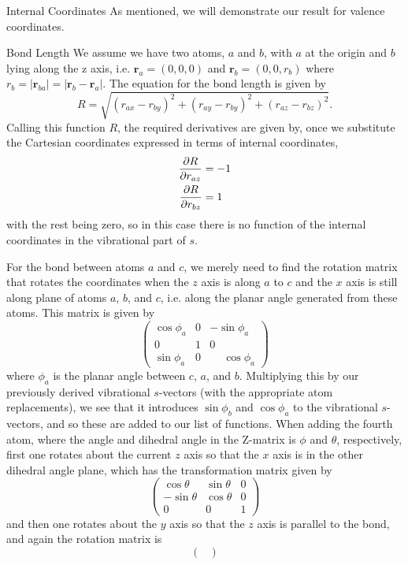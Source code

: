 \documentclass{article}
\newcommand{\vect}[1]{\boldsymbol{#1}}
\begin{document}
\begin{subsection}{Internal Coordinates}
As mentioned, we will demonstrate our result for valence coordinates. 
\begin{subsubsection}{Bond Length}
We assume we have two atoms, $a$ and $b$, with $a$ at the origin and $b$ lying along the z axis, i.e. $\vect{r}_a = (0,0,0)$ and $\vect{r}_b = (0,0,r_b)$ where $r_b = |\vect{r}_{ba}| = |\vect{r}_b - \vect{r}_a|.$ The equation for the bond length is given by 
\[
	R = \sqrt{(r_{ax} - r_{by})^2 + (r_{ay} - r_{by})^2 + (r_{az} - r_{bz})^2}.
\]
Calling this function $R$, the required derivatives are given by, once we substitute the Cartesian coordinates expressed in terms of internal coordinates, 
\[
\begin{split}
	\pdv{R}{r_{az}} &= -1 \\
	\pdv{R}{r_{bz}} &= 1 \\
\end{split}
\]
with the rest being zero, so in this case there is no function of the internal coordinates in the vibrational part of $s$. 
	
For the bond between atoms $a$ and $c$, we merely need to find the rotation matrix that rotates the coordinates when the $z$ axis is along $a$ to $c$ and the $x$ axis is still along plane of atoms $a$, $b$, and $c$, i.e. along the planar angle generated from these atoms. This matrix is given by
\begin{equation}
\label{angle-matrix}
\begin{pmatrix}
\cos\phi_{a}& 0 & -\sin\phi_{a} \\
0 & 1 & 0 \\
	\sin\phi_{a}& 0 & \phantom{-}\cos\phi_{a}
\end{pmatrix}
\end{equation}
	where $\phi_a$ is the planar angle between $c$, $a$, and $b$. Multiplying this by our previously derived vibrational $s$-vectors (with the appropriate atom replacements), we see that it introduces $\sin \phi_b$ and $\cos\phi_a $ to the vibrational $s$-vectors, and so these are added to our list of functions. When adding the fourth atom, where the angle and dihedral angle in the Z-matrix is $\phi$ and $\theta$, respectively, first one rotates about the current $z$ axis so that the $x$ axis is in the other dihedral angle plane, which has the transformation matrix given by
	\begin{equation}
	\label{eq:dihedral_mat}
		\begin{pmatrix}
\cos \theta & \sin \theta & 0 \\
-\sin \theta & \cos \theta & 0 \\
0 & 0 & 1
\end{pmatrix}
	\end{equation} 
and then one rotates about the $y$ axis so that the $z$ axis is parallel to the bond, and again the rotation matrix is
\[
\begin{pmatrix}


\end{pmatrix}\]
\end{subsubsection}
\end{subsection}
\end{document}

